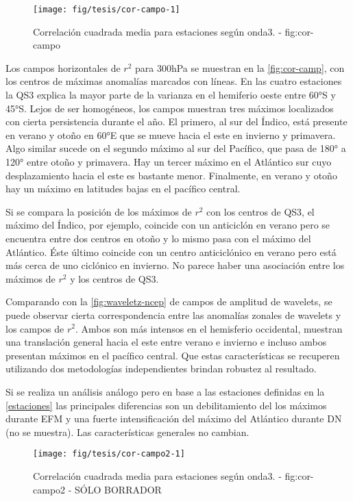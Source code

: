 \documentclass[spanish,a4paper]{book}
\begin{document}
\begin{figure*}
\texttt{[image: fig/tesis/cor-campo-1]} \caption{Correlación cuadrada media para estaciones según onda3. - fig:cor-campo}\label{fig:cor-campo}
\end{figure*}

Los campos horizontales de \(r^2\) para 300hPa se muestran en la
\autoref{fig:cor-camp}, con los centros de máximas anomalías marcados
con líneas. En las cuatro estaciones la QS3 explica la mayor parte de la
varianza en el hemiferio oeste entre 60°S y 45°S. Lejos de ser
homogéneos, los campos muestran tres máximos localizados con cierta
persistencia durante el año. El primero, al sur del Índico, está
presente en verano y otoño en 60°E que se mueve hacia el este en
invierno y primavera. Algo similar sucede on el segundo máximo al sur
del Pacífico, que pasa de 180° a 120° entre otoño y primavera. Hay un
tercer máximo en el Atlántico sur cuyo desplazamiento hacia el este es
bastante menor. Finalmente, en verano y otoño hay un máximo en latitudes
bajas en el pacífico central.

Si se compara la posición de los máximos de \(r^2\) con los centros de
QS3, el máximo del Índico, por ejemplo, coincide con un anticiclón en
verano pero se encuentra entre dos centros en otoño y lo mismo pasa con
el máximo del Atlántico. Éste último coincide con un centro
anticiclónico en verano pero está más cerca de uno ciclónico en
invierno. No parece haber una asociación entre los máximos de \(r^2\) y
los centros de QS3.

Comparando con la \autoref{fig:waveletz-ncep} de campos de amplitud de
wavelets, se puede observar cierta correspondencia entre las anomalías
zonales de wavelets y los campos de \(r^2\). Ambos son más intensos en
el hemisferio occidental, muestran una translación general hacia el este
entre verano e invierno e incluso ambos presentan máximos en el pacífico
central. Que estas características se recuperen utilizando dos
metodologías independientes brindan robustez al resultado.

Si se realiza un análisis análogo pero en base a las estaciones
definidas en la \autoref{estaciones} las principales diferencias son un
debilitamiento del los máximos durante EFM y una fuerte intensificación
del máximo del Atlántico durante DN (no se muestra). Las características
generales no cambian.

\begin{figure*}
\texttt{[image: fig/tesis/cor-campo2-1]} \caption{Correlación cuadrada media para estaciones según onda3. - fig:cor-campo2 - SÓLO BORRADOR}\label{fig:cor-campo2}
\end{figure*}
\end{document}
